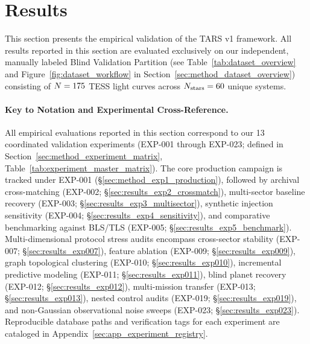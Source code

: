 \section{Results} \label{sec:results}

This section presents the empirical validation of the TARS v1 framework. All results reported in this section are evaluated exclusively on our independent, manually labeled Blind Validation Partition (see Table~\ref{tab:dataset_overview} and Figure~\ref{fig:dataset_workflow} in Section~\ref{sec:method_dataset_overview}) consisting of $N = 175$ TESS light curves across $N_{\text{stars}} = 60$ unique systems.

\paragraph{Key to Notation and Experimental Cross-Reference.}
All empirical evaluations reported in this section correspond to our 13 coordinated validation experiments (EXP-001 through EXP-023; defined in Section~\ref{sec:method_experiment_matrix}, Table~\ref{tab:experiment_master_matrix}). The core production campaign is tracked under EXP-001 (\S\ref{sec:method_exp1_production}), followed by archival cross-matching (EXP-002; \S\ref{sec:results_exp2_crossmatch}), multi-sector baseline recovery (EXP-003; \S\ref{sec:results_exp3_multisector}), synthetic injection sensitivity (EXP-004; \S\ref{sec:results_exp4_sensitivity}), and comparative benchmarking against BLS/TLS (EXP-005; \S\ref{sec:results_exp5_benchmark}). Multi-dimensional protocol stress audits encompass cross-sector stability (EXP-007; \S\ref{sec:results_exp007}), feature ablation (EXP-009; \S\ref{sec:results_exp009}), graph topological clustering (EXP-010; \S\ref{sec:results_exp010}), incremental predictive modeling (EXP-011; \S\ref{sec:results_exp011}), blind planet recovery (EXP-012; \S\ref{sec:results_exp012}), multi-mission transfer (EXP-013; \S\ref{sec:results_exp013}), nested control audits (EXP-019; \S\ref{sec:results_exp019}), and non-Gaussian observational noise sweeps (EXP-023; \S\ref{sec:results_exp023}). Reproducible database paths and verification tags for each experiment are cataloged in Appendix~\ref{sec:app_experiment_registry}.

